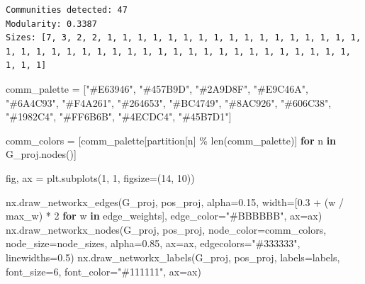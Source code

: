 \documentclass[
  letterpaper,
  DIV=11,
  numbers=noendperiod]{scrartcl}
\newenvironment{Shaded}{\begin{snugshade}}{\end{snugshade}}
\newcommand{\BuiltInTok}[1]{\textcolor[rgb]{0.00,0.23,0.31}{#1}}
\newcommand{\ControlFlowTok}[1]{\textcolor[rgb]{0.00,0.23,0.31}{\textbf{#1}}}
\newcommand{\DecValTok}[1]{\textcolor[rgb]{0.68,0.00,0.00}{#1}}
\newcommand{\FloatTok}[1]{\textcolor[rgb]{0.68,0.00,0.00}{#1}}
\newcommand{\KeywordTok}[1]{\textcolor[rgb]{0.00,0.23,0.31}{\textbf{#1}}}
\newcommand{\NormalTok}[1]{\textcolor[rgb]{0.00,0.23,0.31}{#1}}
\newcommand{\OperatorTok}[1]{\textcolor[rgb]{0.37,0.37,0.37}{#1}}
\newcommand{\StringTok}[1]{\textcolor[rgb]{0.13,0.47,0.30}{#1}}
\begin{document}
\begin{verbatim}
Communities detected: 47
Modularity: 0.3387
Sizes: [7, 3, 2, 2, 1, 1, 1, 1, 1, 1, 1, 1, 1, 1, 1, 1, 1, 1, 1, 1, 1, 1, 1, 1, 1, 1, 1, 1, 1, 1, 1, 1, 1, 1, 1, 1, 1, 1, 1, 1, 1, 1, 1, 1, 1, 1, 1]
\end{verbatim}

\begin{Shaded}
\begin{Highlighting}[]
\NormalTok{comm\_palette }\OperatorTok{=}\NormalTok{ [}\StringTok{"\#E63946"}\NormalTok{, }\StringTok{"\#457B9D"}\NormalTok{, }\StringTok{"\#2A9D8F"}\NormalTok{, }\StringTok{"\#E9C46A"}\NormalTok{, }\StringTok{"\#6A4C93"}\NormalTok{,}
                \StringTok{"\#F4A261"}\NormalTok{, }\StringTok{"\#264653"}\NormalTok{, }\StringTok{"\#BC4749"}\NormalTok{, }\StringTok{"\#8AC926"}\NormalTok{, }\StringTok{"\#606C38"}\NormalTok{,}
                \StringTok{"\#1982C4"}\NormalTok{, }\StringTok{"\#FF6B6B"}\NormalTok{, }\StringTok{"\#4ECDC4"}\NormalTok{, }\StringTok{"\#45B7D1"}\NormalTok{]}

\NormalTok{comm\_colors }\OperatorTok{=}\NormalTok{ [comm\_palette[partition[n] }\OperatorTok{\%} \BuiltInTok{len}\NormalTok{(comm\_palette)]}
               \ControlFlowTok{for}\NormalTok{ n }\KeywordTok{in}\NormalTok{ G\_proj.nodes()]}

\NormalTok{fig, ax }\OperatorTok{=}\NormalTok{ plt.subplots(}\DecValTok{1}\NormalTok{, }\DecValTok{1}\NormalTok{, figsize}\OperatorTok{=}\NormalTok{(}\DecValTok{14}\NormalTok{, }\DecValTok{10}\NormalTok{))}

\NormalTok{nx.draw\_networkx\_edges(G\_proj, pos\_proj, alpha}\OperatorTok{=}\FloatTok{0.15}\NormalTok{,}
\NormalTok{                       width}\OperatorTok{=}\NormalTok{[}\FloatTok{0.3} \OperatorTok{+}\NormalTok{ (w }\OperatorTok{/}\NormalTok{ max\_w) }\OperatorTok{*} \DecValTok{2} \ControlFlowTok{for}\NormalTok{ w }\KeywordTok{in}\NormalTok{ edge\_weights],}
\NormalTok{                       edge\_color}\OperatorTok{=}\StringTok{"\#BBBBBB"}\NormalTok{, ax}\OperatorTok{=}\NormalTok{ax)}
\NormalTok{nx.draw\_networkx\_nodes(G\_proj, pos\_proj, node\_color}\OperatorTok{=}\NormalTok{comm\_colors,}
\NormalTok{                       node\_size}\OperatorTok{=}\NormalTok{node\_sizes, alpha}\OperatorTok{=}\FloatTok{0.85}\NormalTok{, ax}\OperatorTok{=}\NormalTok{ax,}
\NormalTok{                       edgecolors}\OperatorTok{=}\StringTok{"\#333333"}\NormalTok{, linewidths}\OperatorTok{=}\FloatTok{0.5}\NormalTok{)}
\NormalTok{nx.draw\_networkx\_labels(G\_proj, pos\_proj, labels}\OperatorTok{=}\NormalTok{labels, font\_size}\OperatorTok{=}\DecValTok{6}\NormalTok{,}
\NormalTok{                        font\_color}\OperatorTok{=}\StringTok{"\#111111"}\NormalTok{, ax}\OperatorTok{=}\NormalTok{ax)}


\end{Highlighting}
\end{Shaded}
\end{document}

